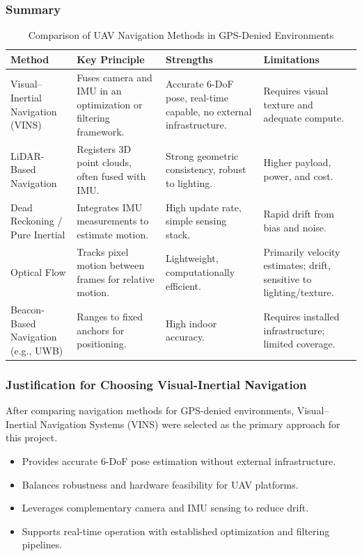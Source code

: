 \subsubsection{Summary}
\begin{table}[H]
\centering
\caption{Comparison of UAV Navigation Methods in GPS-Denied Environments}
\label{tab:uav_navigation_methods}
\begin{tabular}{|p{3cm}|p{4.2cm}|p{4.2cm}|p{3.4cm}|}
\hline
\textbf{Method} & \textbf{Key Principle} & \textbf{Strengths} & \textbf{Limitations} \\
\hline
Visual--Inertial Navigation (VINS) & Fuses camera and IMU in an optimization or filtering framework. & Accurate 6-DoF pose, real-time capable, no external infrastructure. & Requires visual texture and adequate compute. \\
\hline
LiDAR-Based Navigation & Registers 3D point clouds, often fused with IMU. & Strong geometric consistency, robust to lighting. & Higher payload, power, and cost. \\
\hline
Dead Reckoning / Pure Inertial & Integrates IMU measurements to estimate motion. & High update rate, simple sensing stack. & Rapid drift from bias and noise. \\
\hline
Optical Flow & Tracks pixel motion between frames for relative motion. & Lightweight, computationally efficient. & Primarily velocity estimates; drift, sensitive to lighting/texture. \\
\hline
Beacon-Based Navigation (e.g., UWB) & Ranges to fixed anchors for positioning. & High indoor accuracy. & Requires installed infrastructure; limited coverage. \\
\hline
\end{tabular}
\end{table}

\subsubsection{Justification for Choosing Visual-Inertial Navigation}
After comparing navigation methods for GPS-denied environments, Visual--Inertial Navigation Systems (VINS) were selected as the primary approach for this project.
\begin{itemize}
    \item Provides accurate 6-DoF pose estimation without external infrastructure.
    \item Balances robustness and hardware feasibility for UAV platforms.
    \item Leverages complementary camera and IMU sensing to reduce drift.
    \item Supports real-time operation with established optimization and filtering pipelines.
\end{itemize}


